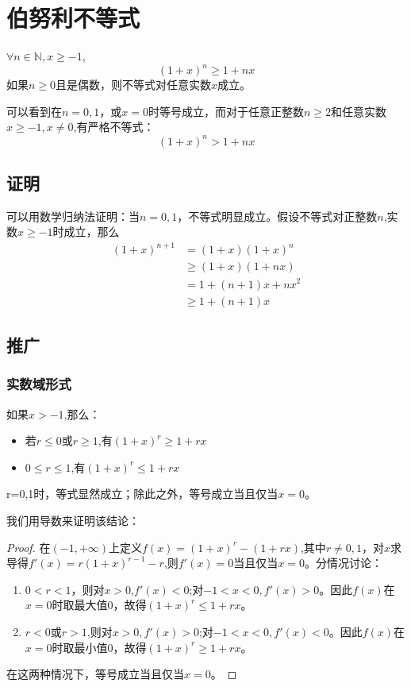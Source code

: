 \documentclass[a4paper]{article} %
\numberwithin{equation}{section} %
\begin{document}
\section{伯努利不等式}

$\forall n\in \mathbb{N},x\ge -1$,
\begin{equation}
(1+x)^n\ge 1+nx
\end{equation}
如果$n\ge 0$且是偶数，则不等式对任意实数$x$成立。

可以看到在$n=0,1$，或$x=0$时等号成立，而对于任意正整数$n\ge 2$和任意实数$x\ge -1,x\neq 0$,有严格不等式：
\begin{equation}
(1+x)^n>1+nx
\end{equation}

\subsection{证明}

可以用数学归纳法证明：当$n=0,1$，不等式明显成立。假设不等式对正整数$n$,实数$x\ge -1$时成立，那么
\begin{align}
(1+x)^{n+1}&=(1+x)(1+x)^n \\
&\ge (1+x)(1+nx) \\
&=1+(n+1)x+nx^2 \\
& \ge 1+(n+1)x
\end{align}

\subsection{推广}

\subsubsection{实数域形式}
如果$x>-1$,那么：
\begin{itemize}
\item 若$r\le 0$或$r\ge 1$,有$(1+x)^r\ge 1+rx$
\item $0\le r \le 1$,有$(1+x)^r\le 1+rx$
\end{itemize}

r=0,1时，等式显然成立；除此之外，等号成立当且仅当$x=0$。

我们用导数来证明该结论：
\begin{proof}
在$(-1,+\infty)$上定义$f(x)=(1+x)^r-(1+rx)$,其中$r\neq 0,1$，对$x$求导得$f'(x)=r(1+x)^{r-1}-r$,则$f'(x)=0$当且仅当$x=0$。分情况讨论：
\begin{enumerate}[1$^\circ$]
\item $0<r<1$，则对$x>0$,$f'(x)<0$;对$-1<x<0,f'(x)>0$。因此$f(x)$在$x=0$时取最大值0，故得$(1+x)^r\le 1+rx$。
\item $r<0$或$r>1$,则对$x>0,f'(x)>0$;对$-1<x<0,f'(x)<0$。因此$f(x)$在$x=0$时取最小值0，故得$(1+x)^r\ge 1+rx$。
\end{enumerate}
在这两种情况下，等号成立当且仅当$x=0$。
\end{proof}
\end{document}
